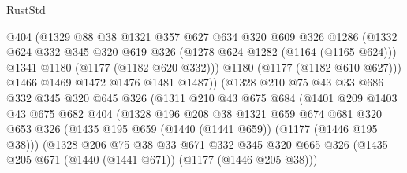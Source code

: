 \begin{lexlean}{RustStd}
\begin{coremodule}
{\begin{coremodule}
{{{{{                        @404
                        (@1329
                          @88
                          @38
                          @1321
                          @357
                          @627
                          @634
                          @320
                          @609
                          @326
                          @1286
                          (@1332
                            @624
                            @332
                            @345
                            @320
                            @619
                            @326
                            (@1278 @624 @1282 (@1164 (@1165 @624)))
                            @1341
                            @1180
                            (@1177 (@1182 @620 @332)))
                          @1180
                          (@1177 (@1182 @610 @627)))
                        @1466
                        @1469
                        @1472
                        @1476
                        @1481
                        @1487))
                    (@1328
                      @210
                      @75
                      @43
                      @33
                      @686
                      @332
                      @345
                      @320
                      @645
                      @326
                      (@1311
                        @210
                        @43
                        @675
                        @684
                        (@1401
                          @209
                          @1403
                          @43
                          @675
                          @682
                          @404
                          (@1328
                            @196
                            @208
                            @38
                            @1321
                            @659
                            @674
                            @681
                            @320
                            @653
                            @326
                            (@1435 @195 @659 (@1440 (@1441 @659)) (@1177 (@1446 @195 @38)))
                            (@1328
                              @206
                              @75
                              @38
                              @33
                              @671
                              @332
                              @345
                              @320
                              @665
                              @326
                              (@1435 @205 @671 (@1440 (@1441 @671)) (@1177 (@1446 @205 @38)))
}}}}}
\end{coremodule}}
\end{coremodule}
\end{lexlean}
